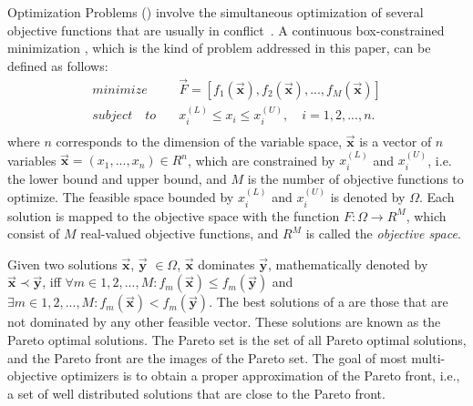  Optimization Problems (\MOPS{}) 
involve the simultaneous optimization of several objective functions that are usually in conflict~\cite{Joel:Kalyanmoy}. 
%
A continuous box-constrained minimization \MOP{}, which is the kind of problem addressed in this paper, can be defined as follows:
\begin{equation}
   \begin{split}
    minimize \quad & \vec{F} = [f_1(\vec{\mathbf{x}}), f_2(\vec{\mathbf{x}}), ..., f_M(\vec{\mathbf{x}})] \\
   subject \quad to \quad &  x_i^{(L)} \leq x_i \leq x_i^{(U)}, \quad i=1,2,..., n. \\
   \end{split}
\end{equation}
where $n$ corresponds to the dimension of the variable space, $\vec{\mathbf{x}}$ is a vector of $n$ 
variables $\vec{\mathbf{x}}=(x_1, ..., x_n) \in R^n$, which are constrained by $x_i^{(L)}$ 
and $x_i^{(U)}$, i.e. the lower bound and upper bound, and $M$ is the number of objective functions
to optimize.
%
The feasible space bounded by $x_i^{(L)}$ and $x_i^{(U)}$ is denoted by $\Omega$.
Each solution is mapped to the objective space with the function $F : \Omega \rightarrow R^M$, 
which consist of $M$ real-valued objective functions, and $R^M$ is called the \textit{objective space}. 

Given two solutions $\vec{\mathbf{x}}$, $\vec{\mathbf{y}}$ $\in \Omega$, $\vec{\mathbf{x}}$ dominates $\vec{\mathbf{y}}$, 
mathematically denoted by $\vec{\mathbf{x}} \prec \vec{\mathbf{y}}$, iff $\forall m \in {1,2,...,M} : 
f_m(\vec{\mathbf{x}}) \leq f_m(\vec{\mathbf{y}})$ and $\exists  m \in {1,2,...,M} : f_m(\vec{\mathbf{x}}) < f_m(\vec{\mathbf{y}})$.
%
The best solutions of a \MOP{} are those that are not dominated by any other feasible vector.
%
These solutions are known as the Pareto optimal solutions.
%
The Pareto set is the set of all Pareto optimal solutions, and the Pareto front are the images of the Pareto set. 
%
The goal of most multi-objective optimizers is to obtain a proper approximation of the Pareto front, i.e., 
a set of well distributed solutions that are close to the Pareto front.

